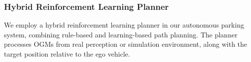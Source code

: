 \documentclass[ conference]{./support/ieeeconf}
\begin{document}
\subsubsection{Hybrid Reinforcement Learning Planner}




We employ a hybrid reinforcement learning planner in our autonomous parking system, combining rule-based and learning-based path planning. 
The planner processes OGMs from real perception or simulation environment, along with the target position relative to the ego vehicle. 
\end{document}
